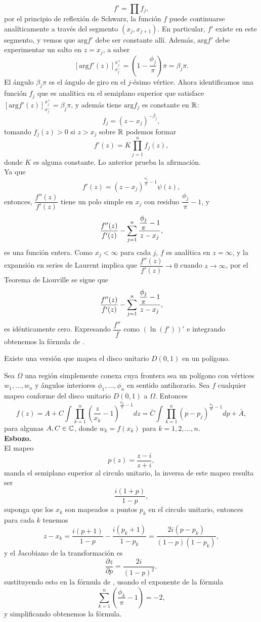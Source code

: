 \begin{teor}
	$$f'=\prod f_j,$$
	por el principio de reflexión de Schwarz, la función $f$ puede continuarse analíticamente a través del segmento $(x_j,x_{j+1})$.  En particular, $f'$ existe
	en este segmento, y vemos que $\mbox{arg} f'$ debe ser constante allí. Además, $\mbox{arg} f'$ debe experimentar un salto en $z = x_j$, a saber
	$$[\mbox{arg}f'(z)]_{x_j^{-}}^{x_j^{+}}=\left(1-\dfrac{\phi_j}{\pi}\right)\pi=\beta_j\pi.$$
	El ángulo $\beta_j\pi $ es el ángulo de giro en el $j$-ésimo vértice. Ahora identificamos una función $f_j$ que es analítica en el semiplano superior que  satisface $[\mbox{arg}f'(z)]_{x_j^{-}}^{x_j^{+}}=\beta_j\pi $, y  además tiene $\mbox{arg}f_j$ es constante en $\mathbb{R}$:
	$$f_j=(z-x_j)^{-\beta_j},$$
	tomando $f_j(z)>0$ si $z>x_j$ sobre $\mathbb{R}$ podemos formar
	$$f'(z)=K\prod_{j=1}^{n}f_j(z),$$
	donde $K$ es alguna constante. Lo anterior prueba la afirmación.\\
	Ya que $$f'(z)=(z-x_j)^{\frac{\phi_j}{\pi}-1}\psi(z),$$ entonces, $\dfrac{f''(z)}{f'(z)}$  tiene un polo simple en $x_j$ con residuo $\dfrac{\phi_j}{\pi}-1$, y 
	$$\dfrac{f''(z)}{f'(z)}-\displaystyle\sum_{j=1}^{n}\dfrac{\dfrac{\phi_j}{\pi}-1}{z-x_j},$$ es una función entera. Como $x_j<\infty$ para cada $j$, $f$ es analítica en $z=\infty$, y la expansión en series de Laurent implica que  $\dfrac{f''(z)}{f'(z)}\rightarrow0$ cuando $z\rightarrow\infty$, por el Teorema de Liouville se sigue que $$\dfrac{f''(z)}{f'(z)}-\displaystyle\sum_{j=1}^{n}\dfrac{\dfrac{\phi_j}{\pi}-1}{z-x_j},$$
	es idénticamente cero. Expresando $\dfrac{f''}{f}$ como $(\ln (f'))'$ e integrando obtenemos la fórmula de \SC.
\end{teor}
Existe una versión que mapea el disco unitario $D(0,1)$  en un polígono.
\begin{teor} 
	Sea $\Omega$ una región simplemente conexa cuya frontera sea un polígono con vértices $w_1,\ldots,w_n$ y ángulos interiores $\phi_1, \ldots,\phi_n $ en sentido antihorario. Sea $f$ cualquier mapeo conforme del disco unitario $D(0,1)$ a $\Omega$. Entonces
	\begin{equation}\label{SCD}
		f(z)=A+C\int\prod_{k=1}^{n}\left(\dfrac{z}{x_k}-1\right)^{\frac{\phi_k}{\pi}-1}dz=\bar{C}\int\prod_{k=1}^{n}(p-p_j)^{\frac{\phi_k}{\pi}-1}dp+\bar{A},
	\end{equation}
	para algunas $A,C\in \mathbb{C}$, donde $w_k=f(x_k)$ para $k=1,2,\ldots,n$.\\
	\textbf{Esbozo.} \\El mapeo 
	$$p(z)=\dfrac{z-i}{z+i},$$
	manda el semiplano superior al circulo unitario, la inversa de este mapeo resulta ser
	$$\dfrac{i(1+p)}{1-p},$$
	suponga que los $x_k$ son mapeados a puntos $p_k$ en el circulo unitario, entonces para cada $k$ tenemos
	$$z-x_k=\dfrac{i(p+1)}{1-p}-\dfrac{i(p_k+1)}{1-p_k}=\dfrac{2i(p-p_k)}{(1-p)(1-p_k)},$$
	y el Jacobiano de la transformación es 
	$$\dfrac{\partial z}{\partial p}=\dfrac{2i}{(1-p)^2},$$
	sustituyendo esto en la fórmula de \SC, usando el exponente de la fórmula 
	$$\sum_{k=1}^{n}\left(\dfrac{\phi_k}{\pi}-1\right)=-2,$$
	y simplificando obtenemos la fórmula.
\end{teor}
